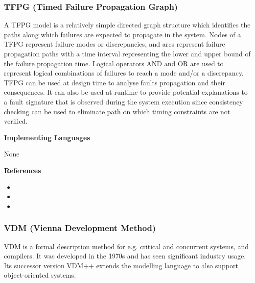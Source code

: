 \subsubsection{TFPG (Timed Failure Propagation Graph)}
\label{subsecF:TFPG}


A TFPG model is a relatively simple directed graph structure which identifies the paths along which failures are expected to propagate in the system. Nodes of a TFPG represent failure modes or discrepancies, and arcs represent failure propagation paths with a time interval representing the lower and upper bound of the failure propagation time. Logical operators AND and OR are used to represent logical combinations of failures to reach a mode and/or a discrepancy. TFPG can be used at design time to analyse faults propagation and their consequences. It can also be used at runtime to provide potential explanations to a fault signature that is observed during the system execution since consistency checking can be used to eliminate path on which timing constraints are not verified.

\textbf{Implementing Languages}

None





\textbf{References}
\begin{itemize}
	
\item {}
	
\item {}
	
\item {}
\end{itemize}



\subsubsection{VDM (Vienna Development Method)}
\label{subsecF:VDM}


VDM is a formal description method for e.g. critical and concurrent systems, and compilers. It was developed in the 1970s and has seen significant industry usage. Its successor version VDM++ extends the modelling language to also support object-oriented systems.

